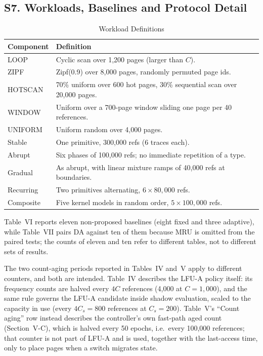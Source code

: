 \documentclass[journal,onecolumn]{IEEEtran}
\begin{document}
\subsection*{S7. Workloads, Baselines and Protocol Detail}
\begin{table}[!t]
\caption{Workload Definitions}
\label{tab:workloads}
\footnotesize
\begin{tabular}{@{}p{}p{}@{}}
\toprule
Component & Definition \\
\midrule
LOOP & Cyclic scan over 1,200 pages (larger than $C$). \\
ZIPF & Zipf(0.9) over 8,000 pages, randomly permuted page ids. \\
HOTSCAN & 70\% uniform over 600 hot pages, 30\% sequential scan over 20,000 pages. \\
WINDOW & Uniform over a 700-page window sliding one page per 40 references. \\
UNIFORM & Uniform random over 4,000 pages. \\
Stable & One primitive, 300,000 refs (6 traces each). \\
Abrupt & Six phases of 100,000 refs; no immediate repetition of a type. \\
Gradual & As abrupt, with linear mixture ramps of 40,000 refs at boundaries. \\
Recurring & Two primitives alternating, $6 \times 80{,}000$ refs. \\
Composite & Five kernel models in random order, $5 \times 100{,}000$ refs. \\
\bottomrule
\end{tabular}
\end{table}

Table~VI reports eleven non-proposed baselines (eight fixed and three
adaptive), while Table~VII pairs DA against ten of them because MRU is omitted
from the paired tests; the counts of eleven and ten refer to different tables,
not to different sets of results.

The two count-aging periods reported in Tables~IV and~V apply to different
counters, and both are intended. Table~IV describes the LFU-A policy itself:
its frequency counts are halved every $4C$ references (4,000 at
$C = 1{,}000$), and the same rule governs the LFU-A candidate inside shadow
evaluation, scaled to the capacity in use (every $4C_s = 800$ references at
$C_s = 200$). Table~V's ``Count aging'' row instead describes the controller's
own fast-path aged count (Section~V-C), which is halved every 50 epochs, i.e.\
every 100,000 references; that counter is not part of LFU-A and is used,
together with the last-access time, only to place pages when a switch migrates
state.
\end{document}
